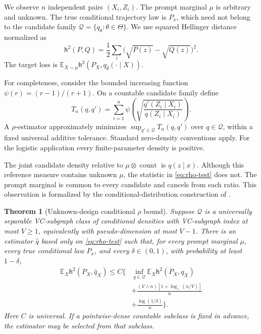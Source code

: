 \documentclass[twoside]{article}
\newtheorem{theorem}{Theorem}
\newcommand{\E}{\mathbb E}
\newcommand{\Q}{\mathcal Q}
\newcommand{\h}{\mathsf h}
\begin{document}
We observe $n$ independent pairs $(X_i,Z_i)$. The prompt marginal $\mu$ is arbitrary and unknown. The true conditional trajectory law is $P_x$, which need not belong to the candidate family $\Q=\{q_\theta:\theta\in\Theta\}$. We use squared Hellinger distance normalized as \[ \h^2(P,Q)=\frac12\sum_z\bigl(\sqrt{P(z)}-\sqrt{Q(z)}\bigr)^2. \] The target loss is $\E_{X\sim\mu}\h^2(P_X,q_{\widehat\theta}(\cdot\mid X))$.

For completeness, consider the bounded increasing function $\psi(r)=(r-1)/(r+1)$. On a countable candidate family define
\begin{equation}
 T_n(q,q')=\sum_{i=1}^n\psi\!\left(\sqrt{\frac{q'(Z_i\mid X_i)}{q(Z_i\mid X_i)}}\right).
 \label{eq:rho-test}
\end{equation}
A $\rho$-estimator approximately minimizes $\sup_{q'\in\Q}T_n(q,q')$ over $q\in\Q$, within a fixed universal additive tolerance. Standard zero-density conventions apply. For the logistic application every finite-parameter density is positive.

The joint candidate density relative to $\mu\otimes\operatorname{count}$ is $q(z\mid x)$. Although this reference measure contains unknown $\mu$, the statistic in \eqref{eq:rho-test} does not. The prompt marginal is common to every candidate and cancels from each ratio. This observation is formalized by the conditional-distribution construction of \citet[Section 8]{baraud2018}.

\begin{theorem}[Unknown-design conditional $\rho$ bound]
\label{thm:rho}
Suppose $\Q$ is a universally separable VC-subgraph class of conditional densities with VC-subgraph index at most $V\geq1$, equivalently with pseudo-dimension at most $V-1$. There is an estimator $\widehat q$ based only on \eqref{eq:rho-test} such that, for every prompt marginal $\mu$, every true conditional law $P_x$, and every $\delta\in(0,1)$, with probability at least $1-\delta$,
\begin{align}
 \E_X\h^2(P_X,\widehat q_X)
 \leq C\bigg\{&\inf_{q\in\Q}\E_X\h^2(P_X,q_X)\nonumber\\
 &+\frac{(V\wedge n)[1+\log_+(n/V)]}{n}\nonumber\\
 &+\frac{\log(1/\delta)}{n}\bigg\}.
 \label{eq:rho-oracle}
\end{align}
Here $C$ is universal. If a pointwise-dense countable subclass is fixed in advance, the estimator may be selected from that subclass.
\end{theorem}
\end{document}
